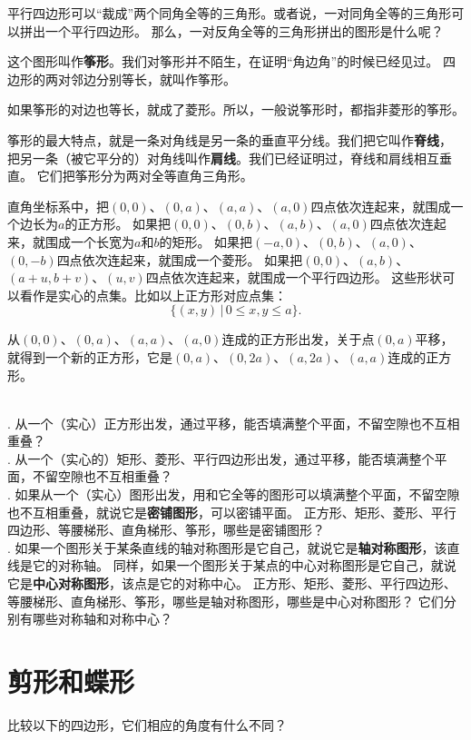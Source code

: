 \documentclass[12pt,UTF8]{ctexbook}
\begin{document}
平行四边形可以“裁成”两个同角全等的三角形。或者说，一对同角全等的三角形可以拼出一个平行四边形。
那么，一对反角全等的三角形拼出的图形是什么呢？

这个图形叫作\textbf{筝形}。我们对筝形并不陌生，在证明“角边角”的时候已经见过。
四边形的两对邻边分别等长，就叫作筝形。

如果筝形的对边也等长，就成了菱形。所以，一般说筝形时，都指非菱形的筝形。

筝形的最大特点，就是一条对角线是另一条的垂直平分线。我们把它叫作\textbf{脊线}，
把另一条（被它平分的）对角线叫作\textbf{肩线}。我们已经证明过，脊线和肩线相互垂直。
它们把筝形分为两对全等直角三角形。

直角坐标系中，把$(0,0)$、$(0,a)$、$(a,a)$、$(a,0)$四点依次连起来，就围成一个边长为$a$的正方形。
如果把$(0,0)$、$(0,b)$、$(a,b)$、$(a,0)$四点依次连起来，就围成一个长宽为$a$和$b$的矩形。
如果把$(-a,0)$、$(0,b)$、$(a,0)$、$(0,-b)$四点依次连起来，就围成一个菱形。
如果把$(0,0)$、$(a,b)$、$(a+u,b+v)$、$(u,v)$四点依次连起来，就围成一个平行四边形。
这些形状可以看作是实心的点集。比如以上正方形对应点集：
$$\{(x,y) \,|\, 0\leqslant x, y \leqslant a\}.$$

从$(0,0)$、$(0,a)$、$(a,a)$、$(a,0)$连成的正方形出发，关于点$(0, a)$平移，
就得到一个新的正方形，它是$(0,a)$、$(0,2a)$、$(a,2a)$、$(a,a)$连成的正方形。

\begin{sk}\label{sk:5-3-0}
    \mbox{}\\
    . 从一个（实心）正方形出发，通过平移，能否填满整个平面，不留空隙也不互相重叠？\\
    . 从一个（实心的）矩形、菱形、平行四边形出发，通过平移，能否填满整个平面，不留空隙也不互相重叠？\\    
    . 如果从一个（实心）图形出发，用和它全等的图形可以填满整个平面，不留空隙也不互相重叠，就说它是\textbf{密铺图形}，可以密铺平面。
    正方形、矩形、菱形、平行四边形、等腰梯形、直角梯形、筝形，哪些是密铺图形？\\    
    . 如果一个图形关于某条直线的轴对称图形是它自己，就说它是\textbf{轴对称图形}，该直线是它的对称轴。
    同样，如果一个图形关于某点的中心对称图形是它自己，就说它是\textbf{中心对称图形}，该点是它的对称中心。
    正方形、矩形、菱形、平行四边形、等腰梯形、直角梯形、筝形，哪些是轴对称图形，哪些是中心对称图形？
    它们分别有哪些对称轴和对称中心？
\end{sk}

\section{剪形和蝶形}
比较以下的四边形，它们相应的角度有什么不同？
\end{document}
